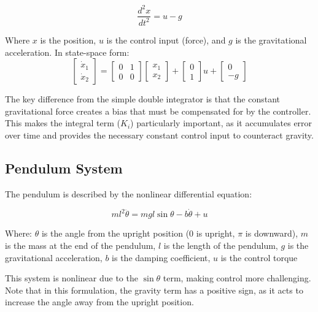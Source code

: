 \documentclass[12pt]{article}
\begin{document}
\begin{equation}
\frac{d^2x}{dt^2} = u - g
\end{equation}

Where $x$ is the position, $u$ is the control input (force), and $g$ is the gravitational acceleration.  In state-space form: 
\begin{equation}
\begin{bmatrix} \dot{x}_1 \\ \dot{x}_2 \end{bmatrix} = 
\begin{bmatrix} 0 & 1 \\ 0 & 0 \end{bmatrix}
\begin{bmatrix} x_1 \\ x_2 \end{bmatrix} + 
\begin{bmatrix} 0 \\ 1 \end{bmatrix} u + 
\begin{bmatrix} 0 \\ -g \end{bmatrix}
\end{equation}

The key difference from the simple double integrator is that the constant gravitational force creates a bias that must be compensated for by the controller.  This makes the integral term ($K_i$) particularly important, as it accumulates error over time and provides the necessary constant control input to counteract gravity.  

\subsection{Pendulum System}
The pendulum is described by the nonlinear differential equation: 

\begin{equation}
ml^2\ddot{\theta} = mgl\sin\theta - b\dot{\theta} + u
\end{equation}

Where:
$\theta$ is the angle from the upright position (0 is upright, $\pi$ is downward), $m$ is the mass at the end of the pendulum, $l$ is the length of the pendulum, $g$ is the gravitational acceleration, $b$ is the damping coefficient, $u$ is the control torque 

This system is nonlinear due to the $\sin\theta$ term, making control more challenging.  Note that in this formulation, the gravity term has a positive sign, as it acts to increase the angle away from the upright position.  
\end{document}
